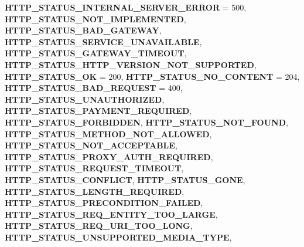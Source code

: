 \begin{DoxyCompactItemize}
{\bfseries H\+T\+T\+P\+\_\+\+S\+T\+A\+T\+U\+S\+\_\+\+I\+N\+T\+E\+R\+N\+A\+L\+\_\+\+S\+E\+R\+V\+E\+R\+\_\+\+E\+R\+R\+OR} = 500, 
{\bfseries H\+T\+T\+P\+\_\+\+S\+T\+A\+T\+U\+S\+\_\+\+N\+O\+T\+\_\+\+I\+M\+P\+L\+E\+M\+E\+N\+T\+ED}, 
\newline
{\bfseries H\+T\+T\+P\+\_\+\+S\+T\+A\+T\+U\+S\+\_\+\+B\+A\+D\+\_\+\+G\+A\+T\+E\+W\+AY}, 
{\bfseries H\+T\+T\+P\+\_\+\+S\+T\+A\+T\+U\+S\+\_\+\+S\+E\+R\+V\+I\+C\+E\+\_\+\+U\+N\+A\+V\+A\+I\+L\+A\+B\+LE}, 
{\bfseries H\+T\+T\+P\+\_\+\+S\+T\+A\+T\+U\+S\+\_\+\+G\+A\+T\+E\+W\+A\+Y\+\_\+\+T\+I\+M\+E\+O\+UT}, 
{\bfseries H\+T\+T\+P\+\_\+\+S\+T\+A\+T\+U\+S\+\_\+\+H\+T\+T\+P\+\_\+\+V\+E\+R\+S\+I\+O\+N\+\_\+\+N\+O\+T\+\_\+\+S\+U\+P\+P\+O\+R\+T\+ED}, 
\newline
{\bfseries H\+T\+T\+P\+\_\+\+S\+T\+A\+T\+U\+S\+\_\+\+OK} = 200, 
{\bfseries H\+T\+T\+P\+\_\+\+S\+T\+A\+T\+U\+S\+\_\+\+N\+O\+\_\+\+C\+O\+N\+T\+E\+NT} = 204, 
{\bfseries H\+T\+T\+P\+\_\+\+S\+T\+A\+T\+U\+S\+\_\+\+B\+A\+D\+\_\+\+R\+E\+Q\+U\+E\+ST} = 400, 
{\bfseries H\+T\+T\+P\+\_\+\+S\+T\+A\+T\+U\+S\+\_\+\+U\+N\+A\+U\+T\+H\+O\+R\+I\+Z\+ED}, 
\newline
{\bfseries H\+T\+T\+P\+\_\+\+S\+T\+A\+T\+U\+S\+\_\+\+P\+A\+Y\+M\+E\+N\+T\+\_\+\+R\+E\+Q\+U\+I\+R\+ED}, 
{\bfseries H\+T\+T\+P\+\_\+\+S\+T\+A\+T\+U\+S\+\_\+\+F\+O\+R\+B\+I\+D\+D\+EN}, 
{\bfseries H\+T\+T\+P\+\_\+\+S\+T\+A\+T\+U\+S\+\_\+\+N\+O\+T\+\_\+\+F\+O\+U\+ND}, 
{\bfseries H\+T\+T\+P\+\_\+\+S\+T\+A\+T\+U\+S\+\_\+\+M\+E\+T\+H\+O\+D\+\_\+\+N\+O\+T\+\_\+\+A\+L\+L\+O\+W\+ED}, 
\newline
{\bfseries H\+T\+T\+P\+\_\+\+S\+T\+A\+T\+U\+S\+\_\+\+N\+O\+T\+\_\+\+A\+C\+C\+E\+P\+T\+A\+B\+LE}, 
{\bfseries H\+T\+T\+P\+\_\+\+S\+T\+A\+T\+U\+S\+\_\+\+P\+R\+O\+X\+Y\+\_\+\+A\+U\+T\+H\+\_\+\+R\+E\+Q\+U\+I\+R\+ED}, 
{\bfseries H\+T\+T\+P\+\_\+\+S\+T\+A\+T\+U\+S\+\_\+\+R\+E\+Q\+U\+E\+S\+T\+\_\+\+T\+I\+M\+E\+O\+UT}, 
{\bfseries H\+T\+T\+P\+\_\+\+S\+T\+A\+T\+U\+S\+\_\+\+C\+O\+N\+F\+L\+I\+CT}, 
\newline
{\bfseries H\+T\+T\+P\+\_\+\+S\+T\+A\+T\+U\+S\+\_\+\+G\+O\+NE}, 
{\bfseries H\+T\+T\+P\+\_\+\+S\+T\+A\+T\+U\+S\+\_\+\+L\+E\+N\+G\+T\+H\+\_\+\+R\+E\+Q\+U\+I\+R\+ED}, 
{\bfseries H\+T\+T\+P\+\_\+\+S\+T\+A\+T\+U\+S\+\_\+\+P\+R\+E\+C\+O\+N\+D\+I\+T\+I\+O\+N\+\_\+\+F\+A\+I\+L\+ED}, 
{\bfseries H\+T\+T\+P\+\_\+\+S\+T\+A\+T\+U\+S\+\_\+\+R\+E\+Q\+\_\+\+E\+N\+T\+I\+T\+Y\+\_\+\+T\+O\+O\+\_\+\+L\+A\+R\+GE}, 
\newline
{\bfseries H\+T\+T\+P\+\_\+\+S\+T\+A\+T\+U\+S\+\_\+\+R\+E\+Q\+\_\+\+U\+R\+I\+\_\+\+T\+O\+O\+\_\+\+L\+O\+NG}, 
{\bfseries H\+T\+T\+P\+\_\+\+S\+T\+A\+T\+U\+S\+\_\+\+U\+N\+S\+U\+P\+P\+O\+R\+T\+E\+D\+\_\+\+M\+E\+D\+I\+A\+\_\+\+T\+Y\+PE}, 

\end{DoxyCompactItemize}
